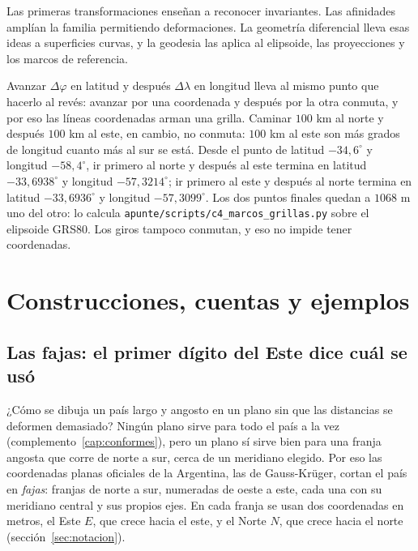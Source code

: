 \begin{resultado}
Las primeras transformaciones enseñan a reconocer invariantes. Las afinidades amplían la
familia permitiendo deformaciones. La geometría diferencial lleva esas ideas a superficies
curvas, y la geodesia las aplica al elipsoide, las proyecciones y los marcos de referencia.
\end{resultado}

\begin{idea}
Avanzar \(\Delta\varphi\) en latitud y después \(\Delta\lambda\) en longitud lleva al mismo punto
que hacerlo al revés: avanzar por una coordenada y después por la otra conmuta, y por eso las
líneas coordenadas arman una grilla. Caminar \(100\) km al norte y después \(100\) km al este, en
cambio, no conmuta: \(100\) km al este son más grados de longitud cuanto más al sur se está.
Desde el punto de latitud \(-34{,}6^\circ\) y longitud \(-58{,}4^\circ\), ir primero al norte y
después al este termina en latitud \(-33{,}6938^\circ\) y longitud \(-57{,}3214^\circ\); ir
primero al este y después al norte termina en latitud \(-33{,}6936^\circ\) y longitud
\(-57{,}3099^\circ\). Los dos puntos finales quedan a \(1068\) m uno del otro: lo calcula
\texttt{apunte/scripts/c4\_marcos\_grillas.py} sobre el elipsoide GRS80. Los giros tampoco
conmutan, y eso no impide tener coordenadas.
\end{idea}

\section{Construcciones, cuentas y ejemplos}

\subsection{Las fajas: el primer dígito del Este dice cuál se usó}\label{sec:fajas-digito}

¿Cómo se dibuja un país largo y angosto en un plano sin que las distancias se deformen
demasiado? Ningún plano sirve para todo el país a la vez (complemento~\ref{cap:conformes}),
pero un plano sí sirve bien para una franja angosta que corre de norte a sur, cerca de un
meridiano elegido. Por eso las coordenadas planas oficiales de la Argentina, las de
Gauss-Krüger, cortan el país en \emph{fajas}: franjas de norte a sur, numeradas de oeste a este,
cada una con su meridiano central y sus propios ejes. En cada franja se usan dos coordenadas en
metros, el Este \(E\), que crece hacia el este, y el Norte \(N\), que crece hacia el norte
(sección~\ref{sec:notacion}).

